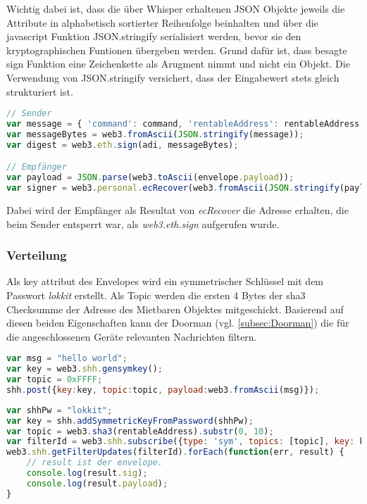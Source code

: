 Wichtig dabei ist, dass die über Whisper erhaltenen JSON Objekte jeweils die Attribute in alphabetisch sortierter Reihenfolge beinhalten und über die javascript Funktion JSON.stringify serialisiert werden, bevor sie den kryptographischen Funtionen übergeben werden. Grund dafür ist, dass besagte sign Funktion eine Zeichenkette als Arugment nimmt und nicht ein Objekt. Die Verwendung von JSON.stringify versichert, dass der Eingabewert stets gleich strukturiert ist.

\begin{lstlisting}[language=javascript,caption={beispiel generate digest und ecRecover}]
// Sender
var message = { 'command': command, 'rentableAddress': rentableAddress, 'key': publicKey };
var messageBytes = web3.fromAscii(JSON.stringify(message));
var digest = web3.eth.sign(adi, messageBytes);

// Empfänger
var payload = JSON.parse(web3.toAscii(envelope.payload));
var signer = web3.personal.ecRecover(web3.fromAscii(JSON.stringify(payload.message)), payload.digest);
\end{lstlisting}
Dabei wird der Empfänger als Resultat von \emph{ecRecover} die Adresse erhalten, die beim Sender entsperrt war, als \emph{web3.eth.sign} aufgerufen wurde.

\subsubsection{Verteilung}
\label{sys_subsubsec:Verteilung}
Als key attribut des Envelopes wird ein symmetrischer Schlüssel mit dem Passwort \emph{lokkit} erstellt. Als Topic werden die ersten 4 Bytes der sha3 Checksumme der Adresse des Mietbaren Objektes mitgeschickt. Basierend auf diesen beiden Eigenschaften kann der Doorman (vgl. \ref{subsec:Doorman}) die für die angeschlossenen Geräte relevanten Nachrichten filtern.

\begin{lstlisting}[language=javascript,caption={Beispiel einer Whisper v5 Nachricht}]
var msg = "hello world";
var key = web3.shh.gensymkey();
var topic = 0xFFFF;
shh.post({key:key, topic:topic, payload:web3.fromAscii(msg)});
\end{lstlisting}


\begin{lstlisting}[language=javascript,caption={Beispiel eines Whisper v5 Filters}]
var shhPw = "lokkit";
var key = shh.addSymmetricKeyFromPassword(shhPw);
var topic = web3.sha3(rentableAddress).substr(0, 10);
var filterId = web3.shh.subscribe({type: 'sym', topics: [topic], key: key});
web3.shh.getFilterUpdates(filterId).forEach(function(err, result) {
    // result ist der envelope.
    console.log(result.sig);
    console.log(result.payload);
}
\end{lstlisting}
